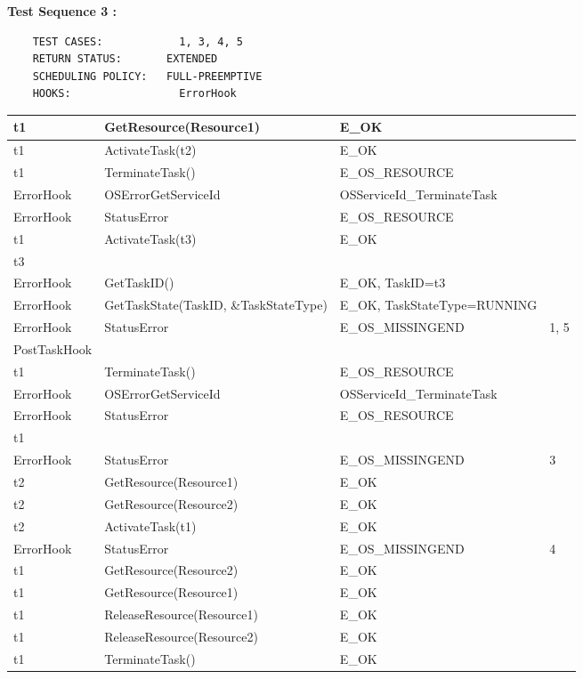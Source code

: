 \documentclass[10pt]{article}
\newlength{\Li}\settowidth{\Li}{Running}
\newlength{\Lii}\setlength{\Lii}{7cm}
\newlength{\Liiii}\setlength{\Liiii}{0.9cm}
\newlength{\Liii}\setlength{\Liii}{\textwidth} \addtolength{\Liii}{-\Li} \addtolength{\Liii}{-\Lii} \addtolength{\Liii}{-\Liiii}
\begin{document}
	\textbf{Test Sequence 3 :}
	\begin{lstlisting}
	TEST CASES:		       1, 3, 4, 5
	RETURN STATUS:	  	 EXTENDED
	SCHEDULING POLICY:   FULL-PREEMPTIVE
	HOOKS:		           ErrorHook
	\end{lstlisting}
	

	\begin{supertabular}{|p{\Li}|p{\Lii}|p{\Liii}|p{\Liiii}|} \hline 
	t1 		& GetResource(Resource1)					& E\_OK												& \\ \hline 
	t1 		& ActivateTask(t2)							& E\_OK												& \\ \hline 
	t1 		& TerminateTask()							& E\_OS\_RESOURCE									& \\ \hline 
	ErrorHook	& OSErrorGetServiceId						& OSServiceId\_TerminateTask							& \\ \hline
	ErrorHook	& StatusError								& E\_OS\_RESOURCE									& \\ \hline
	t1 		& ActivateTask(t3)							& E\_OK												& \\ \hline 
	t3		& 										&													& \\ \hline
	ErrorHook	& GetTaskID()								& E\_OK, TaskID=t3										& \\ \hline
	ErrorHook	& GetTaskState(TaskID, \&TaskStateType)		& E\_OK, TaskStateType=RUNNING						& \\ \hline 
	ErrorHook	& StatusError 								& E\_OS\_MISSINGEND									& 1, 5 \\ \hline
	PostTaskHook&									&													& \\ \hline
	t1 		& TerminateTask()							& E\_OS\_RESOURCE									& \\ \hline 
	ErrorHook	& OSErrorGetServiceId						& OSServiceId\_TerminateTask							& \\ \hline
	ErrorHook	& StatusError								& E\_OS\_RESOURCE									& \\ \hline
	t1		& 										& 													& \\ \hline
	ErrorHook	& StatusError								& E\_OS\_MISSINGEND									& 3 \\ \hline
	t2 		& GetResource(Resource1)					& E\_OK												& \\ \hline 
	t2 		& GetResource(Resource2)					& E\_OK												& \\ \hline 
	t2 		& ActivateTask(t1)							& E\_OK												& \\ \hline 
	ErrorHook	& StatusError								& E\_OS\_MISSINGEND									& 4 \\ \hline
	t1 		& GetResource(Resource2)					& E\_OK												& \\ \hline 
	t1 		& GetResource(Resource1)					& E\_OK												& \\ \hline 
	t1 		& ReleaseResource(Resource1)				& E\_OK												& \\ \hline 
	t1 		& ReleaseResource(Resource2)				& E\_OK												& \\ \hline 
	t1 		& TerminateTask()							& E\_OK												& \\ \hline 
	\end{supertabular}\\
	
\end{document}

